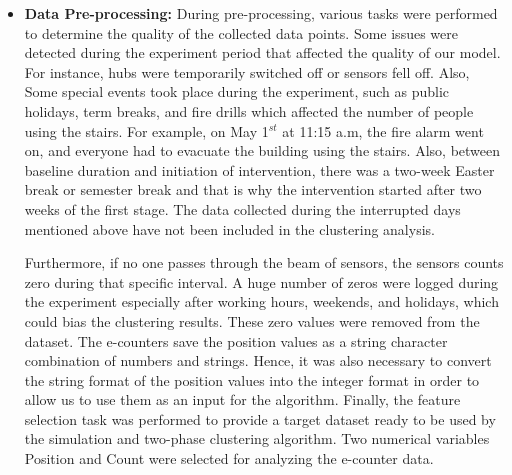 \documentclass[../UNBThesis2.tex]{subfiles}
\begin{document}
\begin{itemize}
\item\textbf{Data Pre-processing:}
During pre-processing, various tasks were performed to determine the quality of the collected data points. Some issues were detected during the experiment period that affected the quality of our model. For instance, hubs were temporarily switched off or sensors fell off. Also, Some special events took place during the experiment, such as public holidays, term breaks, and fire drills which affected the number of people using the stairs. For example, on May 1$^{st}$ at 11:15 a.m, the fire alarm went on, and everyone had to evacuate the building using the stairs. Also, between baseline duration and initiation of intervention, there was a two-week Easter break or semester break and that is why the intervention started after two weeks of the first stage. The data collected during the interrupted days mentioned above have not been included in the clustering analysis.

Furthermore, if no one passes through the beam of sensors, the sensors counts zero during that specific interval. A huge number of zeros were logged during the experiment especially after working hours, weekends, and holidays, which could bias the clustering results. These zero values were removed from the dataset. The e-counters save the position values as a string character combination of numbers and strings. Hence, it was also necessary to convert the string format of the position values into the integer format in order to allow us to use them as an input for the algorithm. 
Finally, the feature selection task was performed to provide a target dataset ready to be used by the simulation and two-phase clustering algorithm. Two numerical variables Position and Count were selected for analyzing the e-counter data.%








\end{itemize}
\end{document}
